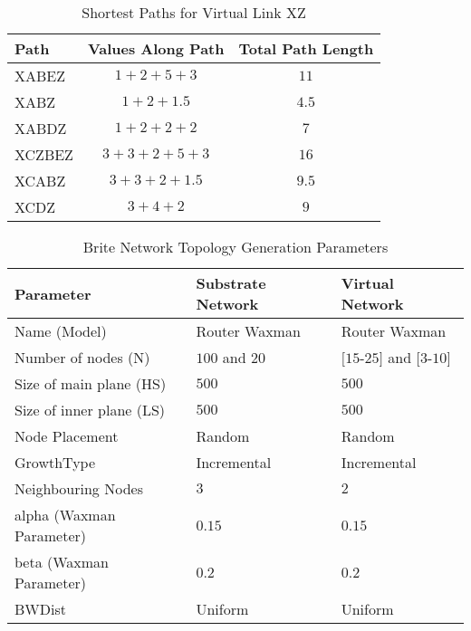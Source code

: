 \documentclass[journal]{IEEEtran}
\begin{document}
\begin{table}[ht!]
\renewcommand{\arraystretch}{1.5}
\caption{Shortest Paths for Virtual Link XZ}
\label{exrun}
\centering
{}
\begin{tabular}{l c c}
\hline
\bfseries Path & \bfseries Values Along Path & \bfseries Total Path Length\\
\hline\hline
XABEZ & $1 + 2 + 5 + 3 $ & $11$\\
XABZ & $1 + 2 + 1.5 $ & $4.5$\\
XABDZ & $1 + 2 + 2 + 2 $ & $7$\\
XCZBEZ & $3 + 3 + 2 + 5 + 3 $ & $16$\\
XCABZ & $3 + 3 + 2 + 1.5 $ & $9.5$\\
XCDZ & $ 3+ 4 + 2 $ & $9$\\
\hline
\end{tabular}
\end{table}
\begin{table}[t!]
\renewcommand{\arraystretch}{1.6}
\caption{Brite Network Topology Generation Parameters}
\label{brite}
\centering
{}
\begin{tabular}{l||l||l}
\hline
\bfseries Parameter & \bfseries Substrate Network & \bfseries Virtual Network\\
\hline\hline
Name (Model) & Router Waxman & Router Waxman\\
Number of nodes (N) & $100$ and $20$ & $[15$-$25]$ and $[3$-$10]$\\
Size of main plane (HS) & $500$ & $500$\\
Size of inner plane (LS) & $500$ & $500$\\
Node Placement & Random & Random \\
GrowthType & Incremental & Incremental\\
Neighbouring Nodes & $3$ & $2$\\
alpha (Waxman Parameter) & $0.15$ & $0.15$\\
beta (Waxman Parameter) & $0.2$ & $0.2$\\
BWDist & Uniform & Uniform\\
\hline
\end{tabular}
\end{table}
\end{document}
